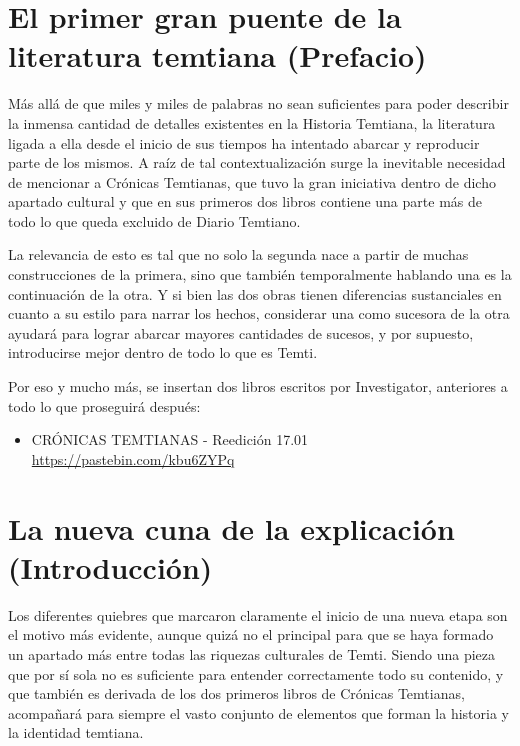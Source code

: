 \documentclass[
  spanish,
]{book}
\providecommand{\tightlist}{%
  \setlength{\itemsep}{0pt}\setlength{\parskip}{0pt}}
\begin{document}
\hypertarget{el-primer-gran-puente-de-la-literatura-temtiana-prefacio}{%
\chapter{El primer gran puente de la literatura temtiana (Prefacio)}\label{el-primer-gran-puente-de-la-literatura-temtiana-prefacio}}

Más allá de que miles y miles de palabras no sean suficientes para poder describir la inmensa cantidad de detalles existentes en la Historia Temtiana, la literatura ligada a ella desde el inicio de sus tiempos ha intentado abarcar y reproducir parte de los mismos. A raíz de tal contextualización surge la inevitable necesidad de mencionar a Crónicas Temtianas, que tuvo la gran iniciativa dentro de dicho apartado cultural y que en sus primeros dos libros contiene una parte más de todo lo que queda excluido de Diario Temtiano.

La relevancia de esto es tal que no solo la segunda nace a partir de muchas construcciones de la primera, sino que también temporalmente hablando una es la continuación de la otra. Y si bien las dos obras tienen diferencias sustanciales en cuanto a su estilo para narrar los hechos, considerar una como sucesora de la otra ayudará para lograr abarcar mayores cantidades de sucesos, y por supuesto, introducirse mejor dentro de todo lo que es Temti.

Por eso y mucho más, se insertan dos libros escritos por Investigator, anteriores a todo lo que proseguirá después:

\begin{itemize}
\tightlist
\item
  CRÓNICAS TEMTIANAS - Reedición 17.01 \url{https://pastebin.com/kbu6ZYPq}
\end{itemize}

\hypertarget{la-nueva-cuna-de-la-explicaciuxf3n-introducciuxf3n}{%
\chapter{La nueva cuna de la explicación (Introducción)}\label{la-nueva-cuna-de-la-explicaciuxf3n-introducciuxf3n}}

Los diferentes quiebres que marcaron claramente el inicio de una nueva etapa son el motivo más evidente, aunque quizá no el principal para que se haya formado un apartado más entre todas las riquezas culturales de Temti. Siendo una pieza que por sí sola no es suficiente para entender correctamente todo su contenido, y que también es derivada de los dos primeros libros de Crónicas Temtianas, acompañará para siempre el vasto conjunto de elementos que forman la historia y la identidad temtiana.
\end{document}
